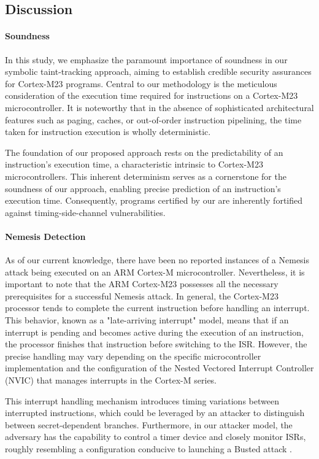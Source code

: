 \subsection{Discussion}

\paragraph{\textbf{Soundness}}
%
In this study, we emphasize the paramount importance of soundness in our
symbolic taint-tracking approach, aiming to establish credible security
assurances for Cortex-M23 programs. Central to our methodology is the
meticulous consideration of the execution time required for instructions on
a Cortex-M23 microcontroller. It is noteworthy that in the absence of
sophisticated architectural features such as paging, caches, or
out-of-order instruction pipelining, the time taken for instruction
execution is wholly deterministic.

The foundation of our proposed approach rests on the predictability of an
instruction's execution time, a characteristic intrinsic to Cortex-M23
microcontrollers. This inherent determinism serves as a cornerstone for the
soundness of our approach, enabling precise prediction of an instruction's
execution time. Consequently, programs certified by our \tool{} are
inherently fortified against timing-side-channel vulnerabilities.

\paragraph{\textbf{Nemesis Detection}}
%
As of our current knowledge, there have been no reported instances of a
Nemesis attack being executed on an ARM Cortex-M microcontroller.
Nevertheless, it is important to note that the ARM Cortex-M23 possesses all
the necessary prerequisites for a successful Nemesis attack. In general,
the Cortex-M23 processor tends to complete the current instruction before
handling an interrupt. This behavior, known as a "late-arriving interrupt"
model, means that if an interrupt is pending and becomes active during the
execution of an instruction, the processor finishes that instruction before
switching to the \ac{ISR}. However, the precise handling may vary depending
on the specific microcontroller implementation and the configuration of the
Nested Vectored Interrupt Controller (NVIC) that manages interrupts in the
Cortex-M series.

This interrupt handling mechanism introduces timing variations between
interrupted instructions, which could be leveraged by an attacker to
distinguish between secret-dependent branches. Furthermore, in our attacker
model, the adversary has the capability to control a timer device and
closely monitor \acp{ISR}, roughly resembling a configuration conducive to
launching a Busted attack \cite{busted}.

